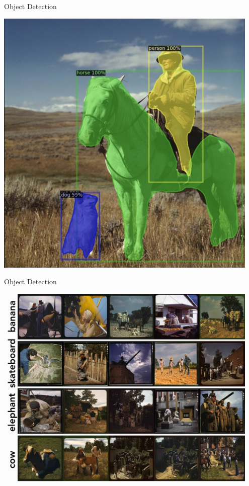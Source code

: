\documentclass[12pt,ignorenonframetext,aspectratio=169]{beamer}
\begin{document}
\begin{frame}{Object Detection}

\begin{center}
\includegraphics[width=0.95\textwidth]{img/object.jpg}
\end{center}

\end{frame}

\begin{frame}{Object Detection}

\begin{center}
\includegraphics[width=0.95\textwidth]{../figures/max_things_grid_labels_small.jpg}
\end{center}

\end{frame}
\end{document}
